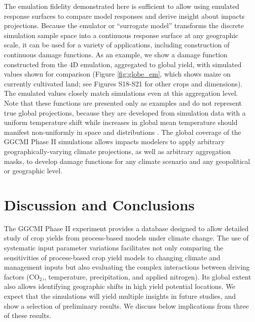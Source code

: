 \documentclass[esd, manuscript]{copernicus} %
\begin{document}
The emulation fidelity demonstrated here is sufficient to allow using emulated response surfaces to compare model responses and derive insight about impacts projections. Because the emulator or ``surrogate model'' transforms the discrete simulation sample space into a continuous response surface at any geographic scale, it can be used for a variety of applications, including construction of continuous damage functions. As an example, we show a damage function constructed from the 4D emulation, aggregated to global yield, with simulated values shown for comparison (Figure \ref{fig:globe_em}, which shows maize on currently cultivated land; see Figures S18-S21 for other crops and dimensions). The emulated values closely match simulations even at this aggregation level. Note that these functions are presented only as examples and do not represent true global projections, because they are developed from simulation data with a uniform temperature shift while increases in global mean temperature should manifest non-uniformly in space and distributions \citep{Sippel2015}. The global coverage of the GGCMI Phase II simulations allows impacts modelers to apply arbitrary geographically-varying climate projections, as well as arbitrary aggregation masks, to develop damage functions for any climate scenario and any geopolitical or geographic level.


\section{Discussion and Conclusions} 
\label{S:6}
The GGCMI Phase II experiment provides a database designed to allow detailed study of crop yields from process-based models under climate change. The use of systematic input parameter variations facilitates not only comparing the sensitivities of process-based crop yield models to changing climate and management inputs but also evaluating the complex interactions between driving factors (CO$_2$,, temperature, precipitation, and applied nitrogen). Its global extent also allows identifying geographic shifts in high yield potential locations. We expect that the simulations will yield multiple insights in future studies, and show a selection of preliminary results. We discuss below implications from three of these results.
\end{document}
